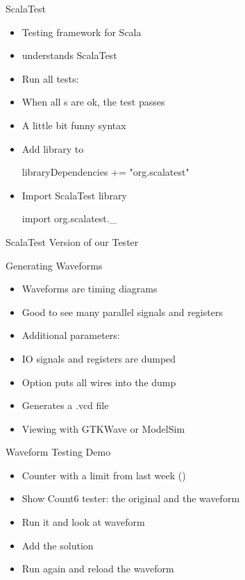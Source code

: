 \begin{frame}[fragile]{ScalaTest}
\begin{itemize}
\item Testing framework for Scala
\item {} understands ScalaTest
\item Run all tests:
\item When all s are ok, the test passes
\item A little bit funny syntax
\item Add library to 
\begin{chisel}
libraryDependencies += "org.scalatest" %
\end{chisel}
\item Import ScalaTest library
\begin{chisel}
import org.scalatest._
\end{chisel}
\end{itemize}
\end{frame}

\begin{frame}[fragile]{ScalaTest Version of our Tester}
\end{frame}

\begin{frame}[fragile]{Generating Waveforms}
\begin{itemize}
\item Waveforms are timing diagrams
\item Good to see many parallel signals and registers
\item Additional parameters: 
\item IO signals and registers are dumped
\item Option  puts all wires into the dump
\item Generates a .vcd file
\item Viewing with GTKWave or ModelSim
\end{itemize}
\end{frame}


\begin{frame}[fragile]{Waveform Testing Demo}
\begin{itemize}
\item Counter with a limit from last week ()
\item Show Count6 tester: the original and the waveform
\item Run it and look at waveform
\item Add the solution
\item Run again and reload the waveform
\end{itemize}
\end{frame}

